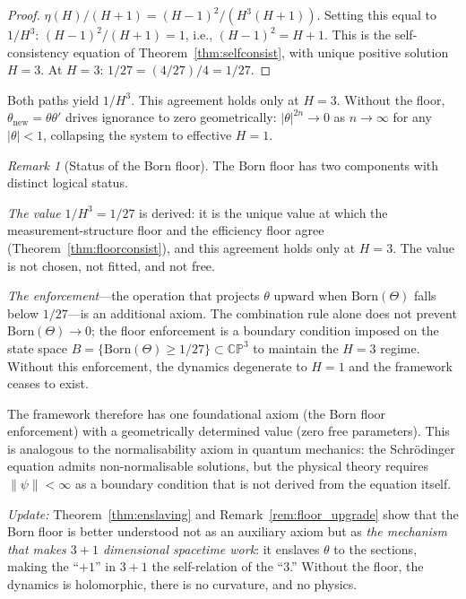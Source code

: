 \documentclass[11pt,a4paper]{article}
\theoremstyle{definition}
\theoremstyle{remark}
\newtheorem{remark}[theorem]{Remark}
\newcommand{\CP}{\mathbb{CP}}
\begin{document}
\begin{proof}
$\eta(H)/(H+1)=(H-1)^2/(H^3(H+1))$. Setting this equal to $1/H^3$: $(H-1)^2/(H+1)=1$, i.e., $(H-1)^2=H+1$. This is the self-consistency equation of Theorem~\ref{thm:selfconsist}, with unique positive solution $H=3$. At $H=3$: $1/27=(4/27)/4=1/27$.
\end{proof}

Both paths yield $1/H^3$. This agreement holds only at $H=3$. Without the floor, $\theta_{\mathrm{new}}=\theta\theta'$ drives ignorance to zero geometrically: $|\theta|^{2n}\to 0$ as $n\to\infty$ for any $|\theta|<1$, collapsing the system to effective $H=1$.

\begin{remark}[Status of the Born floor]\label{rem:floor_status}
The Born floor has two components with distinct logical status.

\emph{The value} $1/H^3=1/27$ is derived: it is the unique value at which the measurement-structure floor and the efficiency floor agree (Theorem~\ref{thm:floorconsist}), and this agreement holds only at $H=3$. The value is not chosen, not fitted, and not free.

\emph{The enforcement}---the operation that projects $\theta$ upward when $\mathrm{Born}(\Theta)$ falls below $1/27$---is an additional axiom. The combination rule alone does not prevent $\mathrm{Born}(\Theta)\to 0$; the floor enforcement is a boundary condition imposed on the state space $B=\{\mathrm{Born}(\Theta)\geq 1/27\}\subset\CP^3$ to maintain the $H=3$ regime. Without this enforcement, the dynamics degenerate to $H=1$ and the framework ceases to exist.

The framework therefore has one foundational axiom (the Born floor enforcement) with a geometrically determined value (zero free parameters). This is analogous to the normalisability axiom in quantum mechanics: the Schr\"odinger equation admits non-normalisable solutions, but the physical theory requires $\|\psi\|<\infty$ as a boundary condition that is not derived from the equation itself.

\emph{Update:} Theorem~\ref{thm:enslaving} and Remark~\ref{rem:floor_upgrade} show that the Born floor is better understood not as an auxiliary axiom but as \emph{the mechanism that makes $3+1$ dimensional spacetime work}: it enslaves $\theta$ to the sections, making the ``$+1$'' in $3+1$ the self-relation of the ``$3$.'' Without the floor, the dynamics is holomorphic, there is no curvature, and no physics.
\end{remark}
\end{document}

